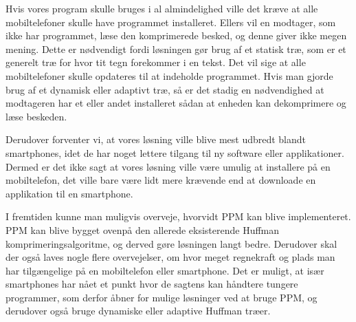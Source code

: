 Hvis vores program skulle bruges i al almindelighed ville det kræve at alle mobiltelefoner skulle have programmet installeret. Ellers vil en modtager, som ikke har programmet, læse den komprimerede besked, og denne giver ikke megen mening. Dette er nødvendigt fordi løsningen gør brug af et statisk træ, som er et generelt træ for hvor tit tegn forekommer i en tekst. Det vil sige at alle mobiltelefoner skulle opdateres til at indeholde programmet. Hvis man gjorde brug af et dynamisk eller adaptivt træ, så er det stadig en nødvendighed at modtageren har et eller andet installeret sådan at enheden kan dekomprimere og læse beskeden.
 
Derudover forventer vi, at vores løsning ville blive mest udbredt blandt smartphones, idet de har noget lettere tilgang til ny software eller applikationer. Dermed er det ikke sagt at vores løsning ville være umulig at installere på en mobiltelefon, det ville bare være lidt mere krævende end at downloade en applikation til en smartphone. 
  
I fremtiden kunne man muligvis overveje, hvorvidt PPM kan blive implementeret. PPM kan blive bygget ovenpå den allerede eksisterende Huffman komprimeringsalgoritme, og derved gøre løsningen langt bedre. Derudover skal der også laves nogle flere overvejelser, om hvor meget regnekraft og plads man har tilgængelige på en mobiltelefon eller smartphone. Det er muligt, at især smartphones har nået et punkt hvor de sagtens kan håndtere tungere programmer, som derfor åbner for mulige løsninger ved at bruge PPM, og derudover også bruge dynamiske eller adaptive Huffman træer.